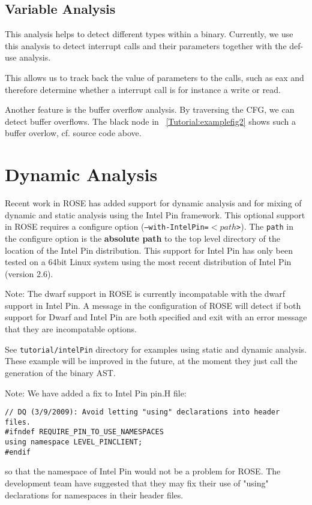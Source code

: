 \subsection{Variable Analysis}

This analysis helps to detect different types within a binary.
Currently, we use this analysis to detect interrupt calls and their parameters together with the def-use analysis.

This allows us to track back the value of parameters to the calls, such as eax and therefore 
determine whether a interrupt call is for instance a write or read.

Another feature is the buffer overflow analysis. By traversing the CFG, we can detect buffer overflows.
The black node in ~\ref{Tutorial:examplefig2} shows such a buffer overlow, cf. source code
above.


\section{Dynamic Analysis}

   Recent work in ROSE has added support for dynamic analysis and for mixing of dynamic
and static analysis using the Intel Pin framework. This optional support in ROSE
requires a configure option ({\tt --with-IntelPin=$<path$>}).  The {\tt path} in
the configure option is the {\bf absolute path} to the top level directory of the location of
the Intel Pin distribution.  This support for Intel Pin has only been tested
on a 64bit Linux system using the most recent distribution of Intel Pin (version 2.6).

Note: The dwarf support in ROSE is currently incompatable with the dwarf support in
Intel Pin.  A message in the configuration of ROSE will detect if both support for
Dwarf and Intel Pin are both specified and exit with an error message that they
are incompatable options.

See {\tt tutorial/intelPin} directory for examples using static and dynamic analysis.
These example will be improved in the future, at the moment they just call the
generation of the binary AST.


Note: We have added a fix to Intel Pin pin.H file:
\begin{verbatim}
// DQ (3/9/2009): Avoid letting "using" declarations into header files.
#ifndef REQUIRE_PIN_TO_USE_NAMESPACES
using namespace LEVEL_PINCLIENT;
#endif
\end{verbatim}
so that the namespace of Intel Pin would not be a problem for ROSE.
The development team have suggested that they may fix their use of "using" 
declarations for namespaces in their header files.

